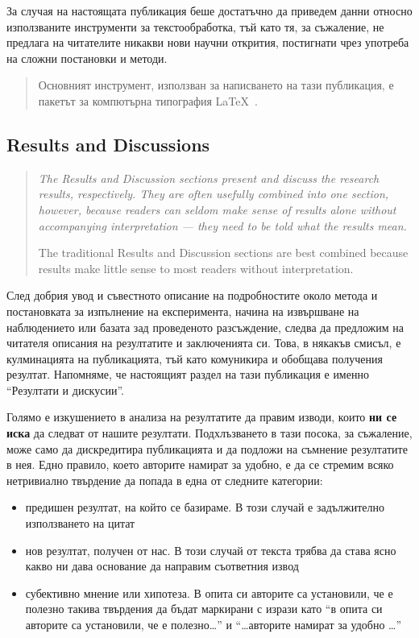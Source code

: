 \documentclass[11pt, oneside]{article}     %
\newenvironment{quotenature}{\begin{quote}\itshape}{\cite{nature}\end{quote}}
\begin{document}
За случая на настоящата публикация беше достатъчно да приведем данни относно използваните инструменти за текстообработка, тъй като тя, за съжаление, не предлага на читателите никакви нови научни открития, постигнати чрез употреба на сложни постановки и методи.

\begin{quote}
  Основният инструмент, използван за написването на тази публикация, е
  пакетът за компютърна типография \LaTeX\ \cite{latex}.
\end{quote}

\subsection*{Results and Discussions}

\begin{quotenature}
  The Results and Discussion sections present and discuss the research results, respectively. They are often usefully combined into one section, however, because readers can seldom make sense of results alone without accompanying interpretation — they need to be told what the results mean.

  The traditional Results and Discussion sections are best combined
  because results make little sense to most readers without
  interpretation.
\end{quotenature}

След добрия увод и съвестното описание на подробностите около метода и постановката за изпълнение на експеримента, начина на извършване на наблюдението или базата зад проведеното разсъждение, следва да предложим на читателя описания на резултатите и заключенията си. Това, в някакъв смисъл, е кулминацията на публикацията, тъй като комуникира и обобщава получения резултат. Напомняме, че настоящият раздел на тази публикация е именно ``Резултати и дискусии''.

Голямо е изкушението в анализа на резултатите да правим изводи, които \textbf{ни се иска} да следват от нашите резултати. Подхлъзването в тази посока, за съжаление, може само да дискредитира публикацията и да подложи на съмнение резултатите в нея. Едно правило, което авторите намират за удобно, е да се стремим всяко нетривиално твърдение 
да попада в една от следните категории:
\begin{itemize}
\item предишен резултат, на който се базираме. В този случай е задължително използването на цитат \cite{citationneeded}
\item нов резултат, получен от нас. В този случай от текста трябва да става ясно какво ни дава основание да направим съответния извод
\item субективно мнение или хипотеза. В опита си авторите са установили, че е полезно такива твърдения да бъдат маркирани с изрази като ``в опита си авторите са установили, че е полезно\ldots'' и ``\ldots авторите намират за удобно \ldots''
\end{itemize}
\end{document}
